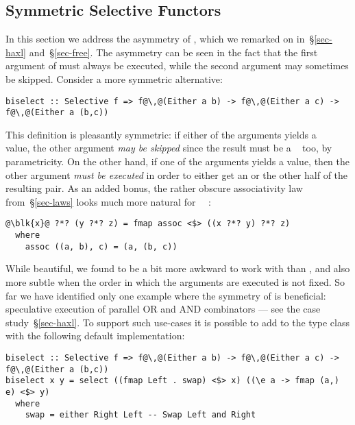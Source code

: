 \subsection{Symmetric Selective Functors}\label{sec-alt-symmetric}

In this section we address the asymmetry of , which we remarked on
in~\S\ref{sec-haxl} and~\S\ref{sec-free}. The asymmetry can be seen in the fact
that the first argument of  must always be executed, while the second
argument may sometimes be skipped. Consider a more symmetric alternative:

\vspace{1mm}
\begin{verbatim}
biselect :: Selective f => f@\,@(Either a b) -> f@\,@(Either a c) -> f@\,@(Either a (b,c))
\end{verbatim}
\vspace{1mm}

\noindent
This definition is pleasantly symmetric: if either of the arguments yields a
~ value, the other argument \emph{may be skipped} since the
result must be a ~ too, by parametricity. On the other hand, if
one of the arguments yields a  value, then the other argument
\emph{must be executed} in order to either get an  or the other half of
the resulting pair. As an added bonus, the rather obscure associativity law
from~\S\ref{sec-laws} looks much more natural for
~\hs{=}~:

\vspace{1mm}
\begin{verbatim}
@\blk{x}@ ?*? (y ?*? z) = fmap assoc <$> ((x ?*? y) ?*? z)
  where
    assoc ((a, b), c) = (a, (b, c))
\end{verbatim}
\vspace{1mm}

\noindent
While beautiful, we found  to be a bit more awkward to work with
than , and also more subtle when the order in which the arguments
are executed is not fixed. So far we have identified only one example where the
symmetry of  is beneficial: speculative execution of parallel OR
and AND combinators --- see the \Haxl case study~\S\ref{sec-haxl}. To support
such use-cases it is possible to add  to the  type
class with the following default implementation:

\vspace{1mm}
\begin{verbatim}
biselect :: Selective f => f@\,@(Either a b) -> f@\,@(Either a c) -> f@\,@(Either a (b,c))
biselect x y = select ((fmap Left . swap) <$> x) ((\e a -> fmap (a,) e) <$> y)
  where
    swap = either Right Left -- Swap Left and Right
\end{verbatim}
\vspace{1mm}

